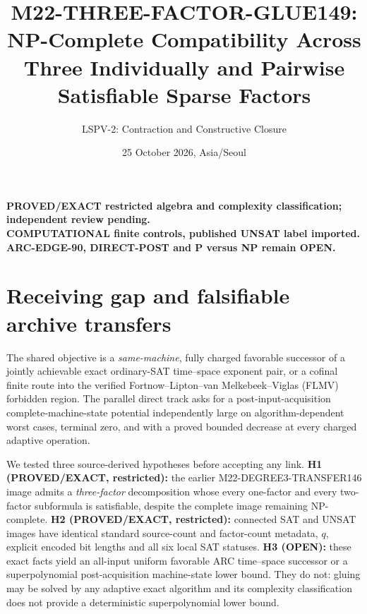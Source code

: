 \documentclass[11pt]{article}
\title{M22-THREE-FACTOR-GLUE149: NP-Complete Compatibility Across Three Individually and Pairwise Satisfiable Sparse Factors}
\author{LSPV-2: Contraction and Constructive Closure}
\date{25 October 2026, Asia/Seoul}
\begin{document}
\maketitle
\begin{center}
\textbf{PROVED/EXACT restricted algebra and complexity classification; independent review pending.}\\
\textbf{COMPUTATIONAL finite controls, published UNSAT label imported.}\\
\textbf{ARC-EDGE-90, DIRECT-POST and P versus NP remain OPEN.}
\end{center}

\section{Receiving gap and falsifiable archive transfers}
The shared objective is a \emph{same-machine}, fully charged favorable successor of a jointly achievable exact ordinary-SAT time--space exponent pair, or a cofinal finite route into the verified Fortnow--Lipton--van Melkebeek--Viglas (FLMV) forbidden region. The parallel direct track asks for a post-input-acquisition complete-machine-state potential independently large on algorithm-dependent worst cases, terminal zero, and with a proved bounded decrease at every charged adaptive operation.

We tested three source-derived hypotheses before accepting any link. \textbf{H1 (PROVED/EXACT, restricted):} the earlier M22-DEGREE3-TRANSFER146 image admits a \emph{three-factor} decomposition whose every one-factor and every two-factor subformula is satisfiable, despite the complete image remaining NP-complete. \textbf{H2 (PROVED/EXACT, restricted):} connected SAT and UNSAT images have identical standard source-count and factor-count metadata, $q$, explicit encoded bit lengths and all six local SAT statuses. \textbf{H3 (OPEN):} these exact facts yield an all-input uniform favorable ARC time--space successor or a superpolynomial post-acquisition machine-state lower bound. They do not: gluing may be solved by any adaptive exact algorithm and its complexity classification does not provide a deterministic superpolynomial lower bound.
\end{document}
